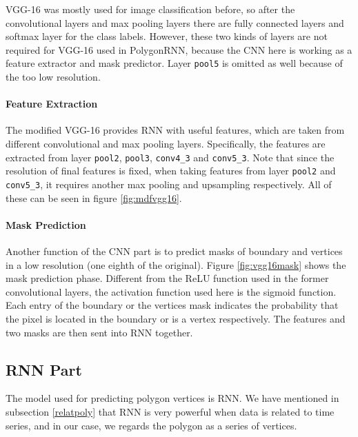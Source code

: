 

VGG-16 was mostly used for image classification before, so after the convolutional layers and max pooling layers there are fully connected layers and softmax layer for the class labels. However, these two kinds of layers are not required for VGG-16 used in PolygonRNN, because the CNN here is working as a feature extractor and mask predictor. Layer \lstinline{pool5} is omitted as well because of the too low resolution.

\paragraph{Feature Extraction} The modified VGG-16 provides RNN with useful features, which are taken from different convolutional and max pooling layers. Specifically, the features are extracted from layer \lstinline{pool2}, \lstinline{pool3}, \lstinline{conv4_3} and \lstinline{conv5_3}. Note that since the resolution of final features is fixed, when taking features from layer \lstinline{pool2} and \lstinline{conv5_3}, it requires another max pooling and upsampling respectively. All of these can be seen in figure \ref{fig:mdfvgg16}.



\paragraph{Mask Prediction}
Another function of the CNN part is to predict masks of boundary and vertices in a low resolution (one eighth of the original). Figure \ref{fig:vgg16mask} shows the mask prediction phase. Different from the ReLU function used in the former convolutional layers, the activation function used here is the sigmoid function. Each entry of the boundary or the vertices mask indicates the probability that the pixel is located in the boundary or is a vertex respectively. The features and two masks are then sent into RNN together.


\subsection{RNN Part}\label{modrnn}
The model used for predicting polygon vertices is RNN. We have mentioned in subsection \ref{relatpoly} that RNN is very powerful when data is related to time series, and in our case, we regards the polygon as a series of vertices.

